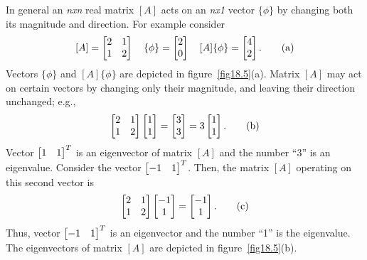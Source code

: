 \documentclass{AeroStructure-ERJohnson}
\begin{document}
In general an \textit{nxn} real matrix $[A]$ acts on an \textit{nx1} vector $\{\phi\}$ by changing both its magnitude and direction. For example consider
\begin{align}\label{18.4a}
[A]=\left[\begin{array}{@{}ll@{}}2 & 1 \\1 & 2\end{array}\right] \quad\{\phi\}=\left[\begin{array}{@{}l@{}}2 \\0\end{array}\right] \quad[A]\{\phi\}=\left[\begin{array}{@{}l@{}}4 \\2\end{array}\right].\tag{a}
\end{align}
Vectors $\{\phi\}$ and $[A]\{\phi\}$ are depicted in figure~\ref{fig18.5}(a). Matrix $[A]$ may act on certain vectors by changing only their magnitude, and leaving their direction unchanged; e.g.,
\begin{align}\label{18.4b}
\left[\begin{array}{@{}ll@{}}2 & 1 \\1 & 2\end{array}\right]\left[\begin{array}{@{}l@{}} 1\\1\end{array}\right]=\left[\begin{array}{@{}l@{}}3 \\3\end{array}\right]=3\left[\begin{array}{@{}l@{}}1 \\1\end{array}\right].\tag{b}
\end{align}
Vector $\left[\begin{array}{@{}ll@{}}1 & 1\end{array}\right]^{T}$ is an eigenvector of matrix $[A]$ and the number ``3'' is an eigenvalue. Consider the vector $\left[\begin{array}{@{}ll@{}}-1 & 1\end{array}\right]^{T}$. Then, the matrix $[A]$ operating on this second vector is
\begin{align}\label{18.4c}
\left[\begin{array}{@{}ll@{}}2 & 1 \\1 & 2\end{array}\right]\left[\begin{array}{@{}c@{}}-1 \\1\end{array}\right]=\left[\begin{array}{@{}c@{}}-1 \\1\end{array}\right].\tag{c}
\end{align}
Thus, vector $\left[\begin{array}{@{}ll@{}}-1 & 1\end{array}\right]^{T}$ is an eigenvector and the number ``1'' is the eigenvalue. The eigenvectors of matrix $[A]$ are depicted in figure~\ref{fig18.5}(b).
\end{document}
